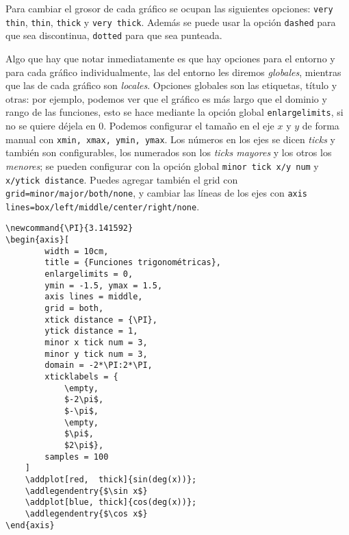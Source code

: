 Para cambiar el grosor de cada gráfico se ocupan las siguientes opciones: \texttt{very thin}, \texttt{thin}, \texttt{thick} y \texttt{very thick}. Además se puede usar la opción \texttt{dashed} para que sea discontinua, \texttt{dotted} para que sea punteada. 

Algo que hay que notar inmediatamente es que hay opciones para el entorno y para cada gráfico individualmente, las del entorno les diremos \textit{globales}, mientras que las de cada gráfico son \textit{locales}. Opciones globales son las etiquetas, título y otras: por ejemplo, podemos ver que el gráfico es más largo que el dominio y rango de las funciones, esto se hace mediante la opción global \texttt{enlargelimits}, si no se quiere déjela en 0. Podemos configurar el tamaño en el eje $x$ y $y$ de forma manual con \texttt{xmin, xmax, ymin, ymax}. Los números en los ejes se dicen \textit{ticks} y también son configurables, los numerados son los \textit{ticks mayores} y los otros los \textit{menores}; se pueden configurar con la opción global \texttt{minor tick x/y num} y \texttt{x/ytick distance}. Puedes agregar también el grid con \texttt{grid=minor/major/both/none}, y cambiar las líneas de los ejes con \texttt{axis lines=box/left/middle/center/right/none}.
\begin{lstlisting}[basicstyle=\footnotesize\ttfamily]
\newcommand{\PI}{3.141592}
\begin{axis}[
		width = 10cm,
		title = {Funciones trigonométricas},
		enlargelimits = 0,
		ymin = -1.5, ymax = 1.5,
		axis lines = middle,
		grid = both,
		xtick distance = {\PI},
		ytick distance = 1,
		minor x tick num = 3,
		minor y tick num = 3,
		domain = -2*\PI:2*\PI,
		xticklabels = {
			\empty,
			$-2\pi$,
			$-\pi$,
			\empty,
			$\pi$,
			$2\pi$},
		samples = 100
	]
	\addplot[red,  thick]{sin(deg(x))};
	\addlegendentry{$\sin x$}
	\addplot[blue, thick]{cos(deg(x))};
	\addlegendentry{$\cos x$}
\end{axis}
\end{lstlisting}
\begin{figure}[!h]
	\centering
\end{figure}

